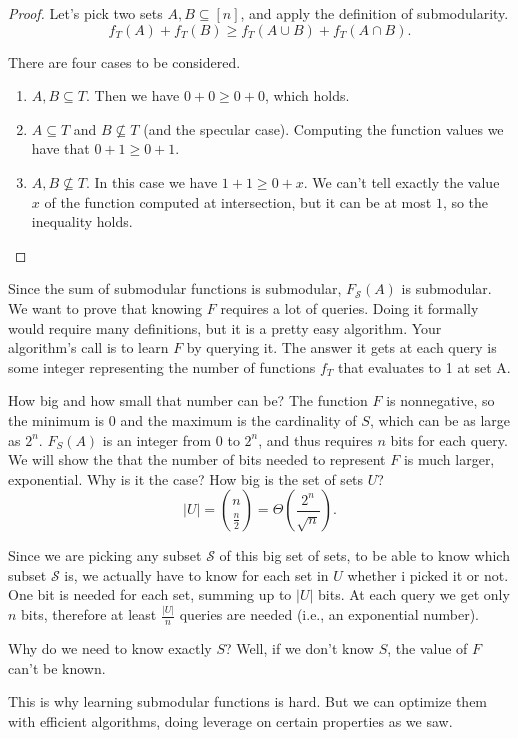\begin{proof}
	Let's pick two sets $A, B \subseteq [n]$, and apply the definition of submodularity.
	\begin{equation}
	f_T(A) + f_T(B) \geq f_T(A \cup B) + f_T(A \cap B).
	\end{equation}
	
	There are four cases to be considered.
	
	\begin{enumerate}
	\item $A, B \subseteq T$. Then we have $0 + 0 \geq 0 + 0$, which holds.
	\item $A \subseteq T$ and $B \not\subseteq T$ (and the specular case). Computing the function values we have that $0 + 1 \geq 0 + 1$.
	\item $A, B \not\subseteq T$. In this case we have $1 + 1 \geq 0 + x$. We can't tell exactly the value $x$ of the function computed at intersection, but it can be at most $1$, so the inequality holds.
	\end{enumerate} 
\end{proof}

Since the sum of submodular functions is submodular, $F_\mathcal{S}(A)$ is submodular. We want to prove that knowing $F$ requires a lot of queries. Doing it formally would require many definitions, but it is a pretty easy algorithm. Your algorithm's call is to learn $F$ by querying it. The answer it gets at each query is  some integer representing the number of functions $f_T$ that evaluates to 1 at set A. 

How big and how small that number can be? The function $F$ is nonnegative, so the minimum is $0$ and the maximum is the cardinality of $S$, which can be as large as $2^n$. $F_S(A)$ is an integer from $0$ to $2^n$, and thus requires $n$ bits for each query. We will show the that the number of bits needed to represent $F$ is much larger, exponential. Why is it the case? How big is the set of sets $U$? 
\begin{equation} \left|U\right| = \binom{n}{\frac{n}{2}} = \Theta\left(\frac{2^n}{\sqrt{n}}\right).\end{equation}

Since we are picking any subset $\mathcal{S}$ of this big set of sets, to be able to know which subset $\mathcal{S}$ is, we actually have to know for each set in $U$ whether i picked it or not. One bit is needed for each set, summing up to $|U|$ bits. At each query we get only $n$ bits, therefore at least  $\frac{|U|}{n}$  queries are needed (i.e., an exponential number).

Why do we need to know exactly $S$? Well, if we don't know $S$, the value of $F$ can't be known. 

This is why learning submodular functions is hard. But we can optimize them with efficient algorithms, doing leverage on certain properties as we saw.
